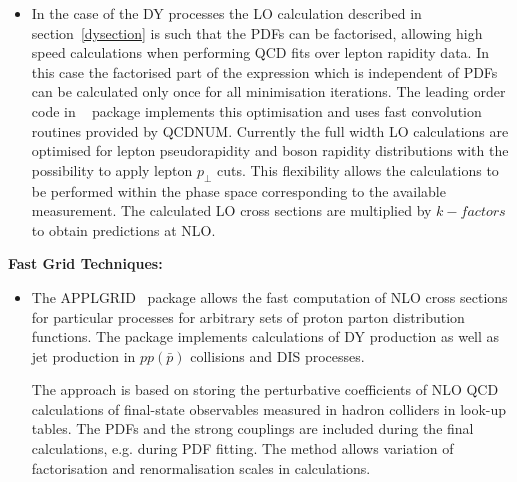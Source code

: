 \begin{description}
\begin{itemize}
\item 
In the case of the DY processes the LO calculation described in section~\ref{dysection}
is such that the PDFs can be factorised, allowing high speed calculations when 
performing QCD fits over lepton rapidity data. In this case
the factorised part of the expression which is independent of PDFs can be
calculated only once for all minimisation iterations.
The leading order code in \fitter~ package implements this 
optimisation and uses fast convolution routines provided by
QCDNUM. Currently the full width LO calculations are optimised 
for lepton pseudorapidity and boson rapidity distributions with the
possibility to apply lepton \(p_{\perp}\) cuts.
This flexibility allows the calculations to be performed within the phase space
corresponding to the available measurement.
The calculated LO cross sections are multiplied by
$k-factors$ to obtain predictions at NLO.

\end{itemize}


\vspace*{0.25cm}
\item \bf {Fast Grid Techniques:} \rm


\begin{itemize}
\item The APPLGRID~\cite{Carli:2010rw} package allows the fast computation 
of NLO cross sections for particular processes for arbitrary sets of 
proton parton distribution functions. The package implements
calculations of DY production as well as jet production in $pp(\bar p)$
collisions and DIS processes. 

The approach is based on storing the perturbative coefficients
of NLO QCD calculations of final-state observables measured
in hadron colliders in look-up tables. The PDFs and the 
strong couplings are included during the final calculations,
e.g. during PDF fitting. The method allows 
variation of factorisation and renormalisation scales in
calculations.


\end{itemize}
\end{description}
